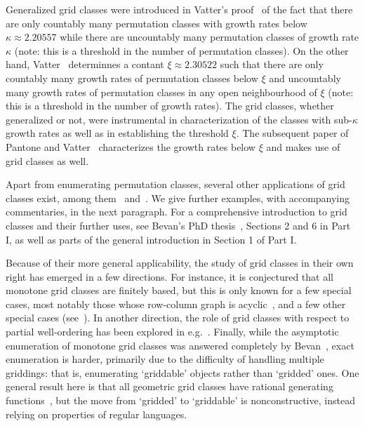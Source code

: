 \documentclass[12pt, a4paper, twoside]{report}
\begin{document}
Generalized grid classes were introduced in Vatter's proof~\cite{vatter11small} of the fact that there are only countably many permutation classes with growth rates below $\kappa \approx 2.20557$ while there are uncountably many permutation classes of growth rate $\kappa$ (note: this is a threshold in the number of permutation classes). On the other hand,  Vatter~\cite{vattercountableuncountable} determinnes a contant $\xi\approx 2.30522$ such that there are only countably many growth rates of permutation classes below $\xi$ and uncountably many growth rates of permutation classes in any open neighbourhood of $\xi$ (note: this is a threshold in the number of growth rates). The grid classes, whether generalized or not, were instrumental in characterization of the classes with sub-$\kappa$ growth rates as well as in establishing the threshold $\xi$. The subsequent paper of Pantone and Vatter~\cite{pantonevatter16categorize} characterizes the growth rates below $\xi$ and makes use of grid classes as well.

Apart from enumerating permutation classes, several other applications of grid classes exist, among them~\cite{albert2011enumeration} and~\cite{bevan-new}. We give further examples, with accompanying commentaries, in the next paragraph. For a comprehensive introduction to grid classes and their further uses, see Bevan's PhD thesis~\cite{bevan2015thesis}, Sections 2 and 6 in Part I, as well as parts of the general introduction in Section 1 of Part I.

Because of their more general applicability, the study of grid classes in their own right has emerged in a few directions. For instance, it is conjectured that all monotone grid classes are finitely based, but this is only known for a few special cases, most notably those whose row-column graph is acyclic~\cite{aabrv2013}, and a few other special cases (see~\cite{albert-brignall-2times2, atkinson1997restricted, waton, bevan2015thesis}). In another direction, the role of grid classes with respect to partial well-ordering has been explored in e.g.~\cite{brignall2012pwo, murphy2003pwo, vatter2011pwo}. Finally, while the asymptotic enumeration of monotone grid classes was answered completely by Bevan~\cite{bevan15growth-rates}, exact enumeration is harder, primarily due to the difficulty of handling multiple griddings: that is, enumerating `griddable' objects rather than `gridded' ones. One general result here is that all geometric grid classes have rational generating functions~\cite{aabrv2013}, but the move from `gridded' to `griddable' is nonconstructive, instead relying on properties of regular languages.
\end{document}
